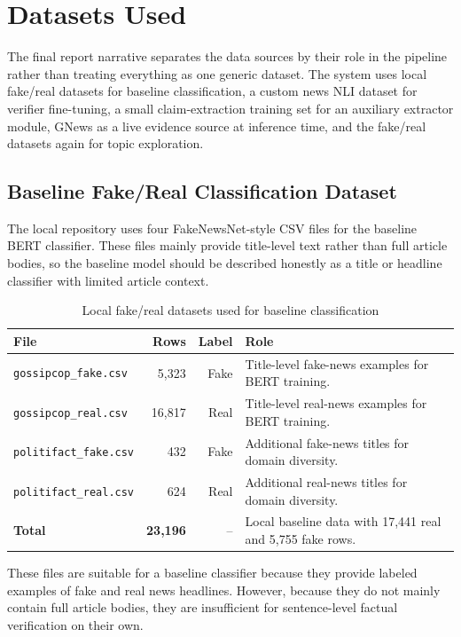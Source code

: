 \documentclass[11pt]{article}
\newcommand{\code}[1]{\texttt{#1}}
\begin{document}
\section{Datasets Used}

The final report narrative separates the data sources by their role in the
pipeline rather than treating everything as one generic dataset. The system uses
local fake/real datasets for baseline classification, a custom news NLI dataset
for verifier fine-tuning, a small claim-extraction training set for an
auxiliary extractor module, GNews as a live evidence source at inference time,
and the fake/real datasets again for topic exploration.

\subsection{Baseline Fake/Real Classification Dataset}

The local repository uses four FakeNewsNet-style CSV files for the baseline
BERT classifier. These files mainly provide title-level text rather than full
article bodies, so the baseline model should be described honestly as a title or
headline classifier with limited article context.

\begin{table}[htbp]
    \centering
    \caption{Local fake/real datasets used for baseline classification}
    \begin{tabularx}{\textwidth}{@{}lrrY@{}}
        \toprule
        \textbf{File} & \textbf{Rows} & \textbf{Label} & \textbf{Role} \\
        \midrule
        \code{gossipcop\_fake.csv} & 5,323 & Fake & Title-level fake-news examples for BERT training. \\
        \code{gossipcop\_real.csv} & 16,817 & Real & Title-level real-news examples for BERT training. \\
        \code{politifact\_fake.csv} & 432 & Fake & Additional fake-news titles for domain diversity. \\
        \code{politifact\_real.csv} & 624 & Real & Additional real-news titles for domain diversity. \\
        \midrule
        \textbf{Total} & \textbf{23,196} & -- & Local baseline data with 17,441 real and 5,755 fake rows. \\
        \bottomrule
    \end{tabularx}
\end{table}

These files are suitable for a baseline classifier because they provide labeled
examples of fake and real news headlines. However, because they do not mainly
contain full article bodies, they are insufficient for sentence-level factual
verification on their own.
\end{document}
